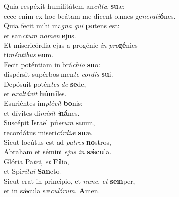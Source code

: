 \oddverse Quia respéxit humilitátem an\textit{cíl}\textit{læ} \textbf{su}æ:~\*\\
\oddverse ecce enim ex hoc beátam me dicent omnes ge\textit{ne}\textit{ra}\textit{ti}\textbf{ó}nes.\\
\evenverse Quia fecit mihi ma\textit{gna} \textit{qui} \textbf{po}tens est:~\*\\
\evenverse et san\textit{ctum} \textit{no}\textit{men} \textbf{e}jus.\\
\oddverse Et misericórdia ejus a progénie \textit{in} \textit{pro}\textbf{gé}nies~\*\\
\oddverse ti\textit{mén}\textit{ti}\textit{bus} \textbf{e}um.\\
\evenverse Fecit poténtiam in brá\textit{chi}\textit{o} \textbf{su}o:~\*\\
\evenverse dispérsit supérbos men\textit{te} \textit{cor}\textit{dis} \textbf{su}i.\\
\oddverse Depósuit potén\textit{tes} \textit{de} \textbf{se}de,~\*\\
\oddverse et e\textit{xal}\textit{tá}\textit{vit} \textbf{hú}\textbf{mi}les.\\
\evenverse Esuriéntes im\textit{plé}\textit{vit} \textbf{bo}nis:~\*\\
\evenverse et dívites di\textit{mí}\textit{sit} \textit{i}\textbf{ná}nes.\\
\oddverse Suscépit Israël pú\textit{e}\textit{rum} \textbf{su}um,~\*\\
\oddverse recordátus miseri\textit{cór}\textit{di}\textit{æ} \textbf{su}æ.\\
\evenverse Sicut locútus est ad \textit{pa}\textit{tres} \textbf{no}stros,~\*\\
\evenverse Abraham et sémini \textit{e}\textit{jus} \textit{in} \textbf{sǽ}\textbf{cu}la.\\
\oddverse Glória Pa\textit{tri}, \textit{et} \textbf{Fí}lio,~\*\\
\oddverse et Spi\textit{rí}\textit{tu}\textit{i} \textbf{San}cto.\\
\evenverse Sicut erat in princípio, et \textit{nunc}, \textit{et} \textbf{sem}per,~\*\\
\evenverse et in sǽcula sæ\textit{cu}\textit{ló}\textit{rum}. \textbf{A}men.\\
